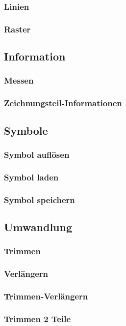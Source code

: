 \documentclass[a5paper]{book}
\begin{document}
			\subsubsection{Linien} 
			\subsubsection{Raster} 
		\subsection{Information}
			\subsubsection{Messen} 
			\subsubsection{Zeichnungsteil-Informationen} 
		\subsection{Symbole}
			\subsubsection{Symbol auflösen}
			\subsubsection{Symbol laden} 
			\subsubsection{Symbol speichern} 
		\subsection{Umwandlung}		
			\subsubsection{Trimmen} 
			\subsubsection{Verlängern} 
			\subsubsection{Trimmen-Verlängern} 
			\subsubsection{Trimmen 2 Teile} 
\end{document}
